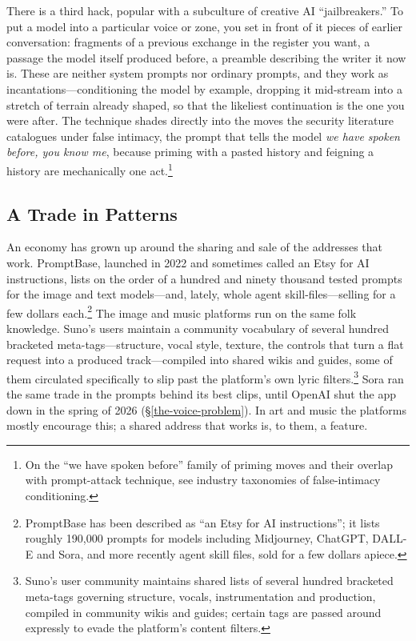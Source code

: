 There is a third hack, popular with a subculture of creative AI ``jailbreakers.'' To put a model into a particular voice or zone, you set in front of it pieces of earlier conversation: fragments of a previous exchange in the register you want, a passage the model itself produced before, a preamble describing the writer it now is. These are neither system prompts nor ordinary prompts, and they work as incantations---conditioning the model by example, dropping it mid-stream into a stretch of terrain already shaped, so that the likeliest continuation is the one you were after. The technique shades directly into the moves the security literature catalogues under false intimacy, the prompt that tells the model \emph{we have spoken before, you know me}, because priming with a pasted history and feigning a history are mechanically one act.\footnote{On the ``we have spoken before'' family of priming moves and their overlap with prompt-attack technique, see industry taxonomies of false-intimacy conditioning.}

\subsection{A Trade in Patterns}

An economy has grown up around the sharing and sale of the addresses that work. PromptBase, launched in 2022 and sometimes called an Etsy for AI instructions, lists on the order of a hundred and ninety thousand tested prompts for the image and text models---and, lately, whole agent skill-files---selling for a few dollars each.\footnote{PromptBase has been described as ``an Etsy for AI instructions''; it lists roughly 190{,}000 prompts for models including Midjourney, ChatGPT, DALL-E and Sora, and more recently agent skill files, sold for a few dollars apiece.} The image and music platforms run on the same folk knowledge. Suno's users maintain a community vocabulary of several hundred bracketed meta-tags---structure, vocal style, texture, the controls that turn a flat request into a produced track---compiled into shared wikis and guides, some of them circulated specifically to slip past the platform's own lyric filters.\footnote{Suno's user community maintains shared lists of several hundred bracketed meta-tags governing structure, vocals, instrumentation and production, compiled in community wikis and guides; certain tags are passed around expressly to evade the platform's content filters.} Sora ran the same trade in the prompts behind its best clips, until OpenAI shut the app down in the spring of 2026 (\S\ref{the-voice-problem}). In art and music the platforms mostly encourage this; a shared address that works is, to them, a feature.

